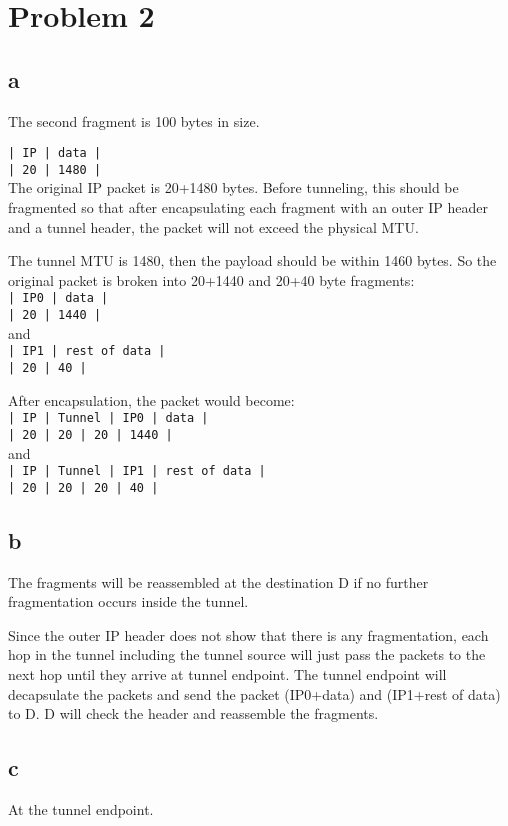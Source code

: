 \documentclass[11pt]{article}
\begin{document}
\section{Problem 2}
\subsection{a}
The second fragment is 100 bytes in size.

\texttt{| IP | data |}\\
\texttt{| 20 | 1480 |}\\
The original IP packet is 20+1480 bytes. Before tunneling, this should be fragmented so that after encapsulating each fragment with an outer IP header and a tunnel header, the packet will not exceed the physical MTU.

The tunnel MTU is 1480, then the payload should be within 1460 bytes. So the original packet is broken into 20+1440 and 20+40 byte fragments:\\
\texttt{| IP0 | data |}\\
\texttt{| 20   | 1440 |}\\
and\\
\texttt{| IP1 | rest of data |}\\
\texttt{| 20   | 40 |}

After encapsulation, the packet would become:\\
\texttt{| IP | Tunnel | IP0 | data |}\\
\texttt{| 20 | 20 | 20 | 1440 |}\\
and\\
\texttt{| IP | Tunnel | IP1 | rest of data |}\\
\texttt{| 20 | 20 | 20 | 40 |}

\subsection{b}
The fragments will be reassembled at the destination D if no further fragmentation occurs inside the tunnel.

Since the outer IP header does not show that there is any fragmentation, each hop in the tunnel including the tunnel source will just pass the packets to the next hop until they arrive at tunnel endpoint. The tunnel endpoint will decapsulate the packets and send the packet (IP0+data) and (IP1+rest of data) to D. D will check the header and reassemble the fragments.

\subsection{c}
At the tunnel endpoint.
\end{document}
